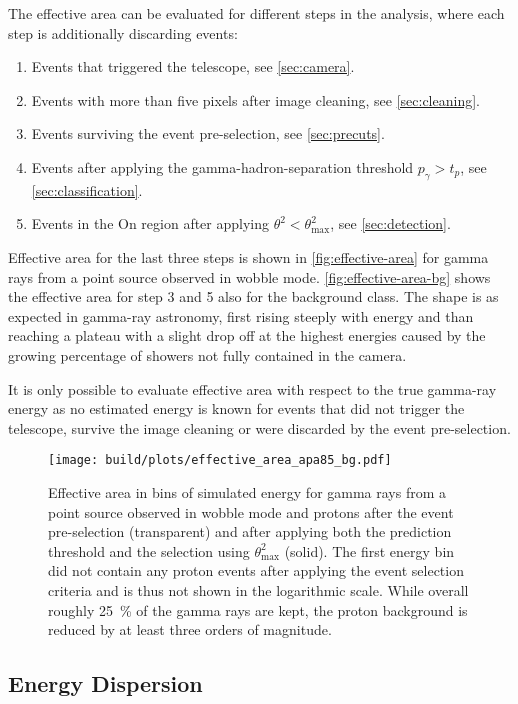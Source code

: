 The effective area can be evaluated for different steps in the analysis, where
each step is additionally discarding events:
\begin{enumerate}
  \item Events that triggered the telescope, see \autoref{sec:camera}.
  \item Events with more than five pixels after image cleaning, see \autoref{sec:cleaning}.
  \item Events surviving the event pre-selection, see \autoref{sec:precuts}.
  \item Events after applying the gamma-hadron-separation threshold $p_\gamma > t_p$, see \autoref{sec:classification}.
  \item Events in the On region after applying $\theta^2 < \theta^2_{\max}$, see \autoref{sec:detection}.
\end{enumerate}

Effective area for the last three steps is shown in \autoref{fig:effective-area} 
for gamma rays from a point source observed in wobble mode. 
\autoref{fig:effective-area-bg} shows the effective area for step 3 and 5 
also for the background class.
The shape is as expected in gamma-ray astronomy, first rising steeply with
energy and than reaching a plateau with a slight drop off at the highest energies
caused by the growing percentage of showers not fully contained in the camera.

It is only possible to evaluate effective area with respect to the
true gamma-ray energy as no estimated energy is known for events
that did not trigger the telescope, survive the image cleaning or were discarded
by the event pre-selection.


\begin{figure}
  \centering
  \texttt{[image: build/plots/effective\_area\_apa85\_bg.pdf]}
  \caption{%
    Effective area in bins of simulated energy for gamma rays from a point source observed in wobble mode and protons after the event pre-selection (transparent)
    and after applying both the prediction threshold and the selection using $θ^2_{\max}$ (solid).
    The first energy bin did not contain any proton events after applying the
    event selection criteria and is thus not shown in the logarithmic scale.
    While overall roughly \SI{25}{\percent} of the gamma rays are kept, 
    the proton background is reduced by at least three orders of magnitude.
  }\label{fig:effective-area-bg}
\end{figure}


\subsection{Energy Dispersion}\label{sec:energy-dispersion}


